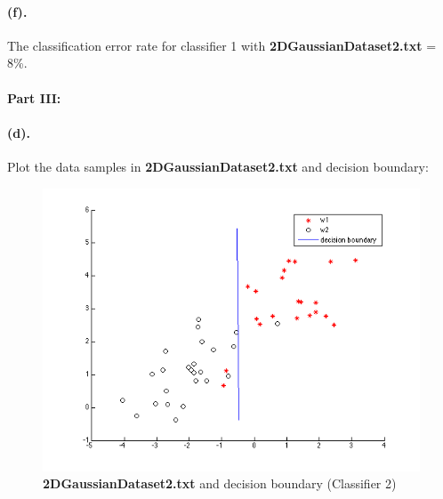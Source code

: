 \documentclass[a4paper]{article}
\begin{document}
\paragraph{(f).} The classification error rate for classifier 1 with \textbf{2DGaussianDataset2.txt} = 8\%.

\paragraph{Part III:}
\paragraph{(d).} Plot the data samples in \textbf{2DGaussianDataset2.txt} and decision boundary: \\
\begin{figure}[H]
  \centering
    \includegraphics[scale=.6]{images/3_d.png}
  \caption{\textbf{2DGaussianDataset2.txt} and decision boundary (Classifier 2)}
\end{figure}
\end{document}
